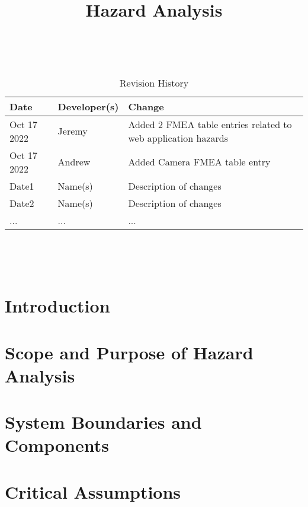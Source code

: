\documentclass{article}
\title{Hazard Analysis\\\progname}
\author{\authname}
\date{}
\begin{document}
\maketitle
\thispagestyle{empty}

~\newpage


\begin{table}[hp]
\caption{Revision History} \label{TblRevisionHistory}
\begin{tabularx}{\textwidth}{llX}
\toprule
\textbf{Date} & \textbf{Developer(s)} & \textbf{Change}\\
\midrule
Oct 17 2022 & Jeremy & Added 2 FMEA table entries related to web application hazards\\
Oct 17 2022 & Andrew & Added Camera FMEA table entry\\
Date1 & Name(s) & Description of changes\\
Date2 & Name(s) & Description of changes\\
... & ... & ...\\
\bottomrule
\end{tabularx}
\end{table}

~\newpage

\tableofcontents

~\newpage



\section{Introduction}


\section{Scope and Purpose of Hazard Analysis}

\section{System Boundaries and Components}

\section{Critical Assumptions}
\end{document}

